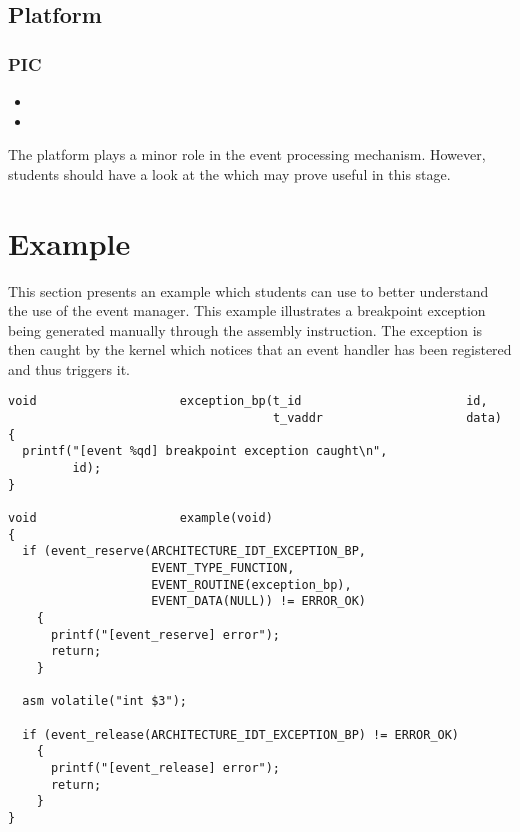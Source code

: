 \subsection{Platform}

\subsubsection*{PIC}

\begin{itemize}
  \item
  \item
\end{itemize}

The platform plays a minor role in the event processing mechanism. However,
students should have a look at the  which may prove useful in this stage.

%
%

\section{Example}

This section presents an example which students can use to better understand
the use of the event manager. This example illustrates a breakpoint exception
being generated manually through the  assembly instruction.
The exception is then caught by the kernel which notices that an event handler
has been registered and thus triggers it.

\begin{verbatim}
void                    exception_bp(t_id                       id,
                                     t_vaddr                    data)
{
  printf("[event %qd] breakpoint exception caught\n",
         id);
}

void                    example(void)
{
  if (event_reserve(ARCHITECTURE_IDT_EXCEPTION_BP,
                    EVENT_TYPE_FUNCTION,
                    EVENT_ROUTINE(exception_bp),
                    EVENT_DATA(NULL)) != ERROR_OK)
    {
      printf("[event_reserve] error");
      return;
    }

  asm volatile("int $3");

  if (event_release(ARCHITECTURE_IDT_EXCEPTION_BP) != ERROR_OK)
    {
      printf("[event_release] error");
      return;
    }
}
\end{verbatim}

